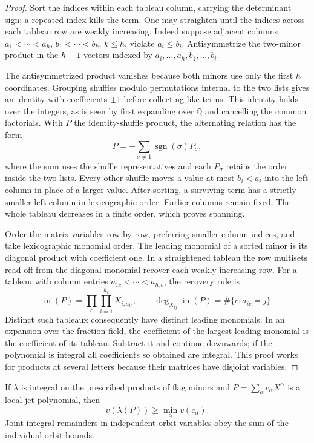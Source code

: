 \begin{proof}
Sort the indices within each tableau column,
carrying the determinant sign; a repeated index kills the term.
One may straighten until the indices across each tableau row
are weakly increasing. Indeed suppose adjacent columns
\(a_1<\cdots<a_h\), \(b_1<\cdots<b_k\), \(k\le h\),
violate \(a_i\le b_i\). Antisymmetrize the two-minor product
in the \(h+1\) vectors indexed by
\(a_i,\ldots,a_h,b_1,\ldots,b_i\).

The antisymmetrized product vanishes because both minors use only the first \(h\) coordinates. Grouping shuffles
modulo permutations internal to the two lists gives an identity
with coefficients \(\pm1\) before collecting like terms. This
identity holds over the integers, as is seen by first expanding
over \(\mathbb Q\) and cancelling the common factorials.
With \(P\) the identity-shuffle product, the alternating relation has the form
\[
  P=-\sum_{\sigma\ne1}\operatorname{sgn}(\sigma)P_\sigma,
\]
where the sum uses the shuffle representatives and each \(P_\sigma\) retains the order inside the two lists. Every other shuffle
moves a value at most \(b_i<a_i\) into the left column in place
of a larger value. After sorting, a surviving term has a
strictly smaller left column in lexicographic order. Earlier
columns remain fixed. The whole tableau decreases in a finite
order, which proves spanning.

Order the matrix variables row by row, preferring smaller
column indices, and take lexicographic monomial order. The
leading monomial of a sorted minor is its diagonal product
with coefficient one. In a straightened tableau the row
multisets read off from the diagonal monomial recover each
weakly increasing row.
For a tableau with column entries \(a_{1c}<\cdots<a_{h_c c}\), the recovery rule is
\[
  \operatorname{in}(P)=\prod_c\prod_{i=1}^{h_c}X_{i,a_{ic}},\qquad \deg_{X_{ij}}\operatorname{in}(P)=\#\{c:a_{ic}=j\}.
\]
 Distinct such tableaux consequently have
distinct leading monomials. In an expansion over the fraction
field, the coefficient of the largest leading monomial is the
coefficient of its tableau. Subtract it and continue downwards;
if the polynomial is integral all coefficients so obtained
are integral. This proof works for products at several
letters because their matrices have disjoint variables.

\end{proof}

\begin{lemma}
\label{lem:jet-functional-coefficient-bound}
If \(\lambda\) is integral on the prescribed products of flag minors and \(P=\sum_\alpha c_\alpha X^\alpha\) is a local jet polynomial, then
\[
 v(\lambda(P))\ge\min_\alpha v(c_\alpha).
\]
 Joint integral remainders in independent
orbit variables obey the sum of the individual orbit bounds.
\end{lemma}


